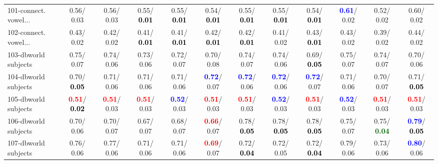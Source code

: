\begin{table}[h]
\begin{center}
{\begin{tabular}{lc|c|c|c|c|c|c|c|c|c|c}
101-connect. vowel... &   0.56/  0.03 &   0.56/  0.03 &   0.55/\textcolor{black}{\textbf{  0.01}} &   0.55/\textcolor{black}{\textbf{  0.01}} &   0.54/\textcolor{black}{\textbf{  0.01}} &   0.55/\textcolor{black}{\textbf{  0.01}} &   0.55/\textcolor{black}{\textbf{  0.01}} &   0.54/\textcolor{black}{\textbf{  0.01}} & \textcolor{blue}{\textbf{  0.61}}/  0.02 &   0.52/  0.02 &   0.60/  0.02 \\
102-connect. vowel... &   0.43/  0.02 &   0.42/  0.02 &   0.41/\textcolor{black}{\textbf{  0.01}} &   0.41/\textcolor{black}{\textbf{  0.01}} &   0.42/\textcolor{black}{\textbf{  0.01}} &   0.42/\textcolor{black}{\textbf{  0.01}} &   0.41/  0.02 &   0.43/\textcolor{black}{\textbf{  0.01}} &   0.43/  0.02 &   0.39/  0.02 &   0.44/  0.02 \\
103-dbworld subjects &   0.75/  0.07 &   0.74/  0.06 &   0.73/  0.06 &   0.72/  0.07 &   0.70/  0.08 &   0.74/  0.07 &   0.74/  0.06 &   0.69/\textcolor{black}{\textbf{  0.05}} &   0.75/  0.07 &   0.74/  0.07 &   0.70/  0.06 \\ \hline
104-dbworld subjects &   0.70/\textcolor{black}{\textbf{  0.05}} &   0.71/  0.06 &   0.71/  0.06 &   0.71/  0.06 & \textcolor{blue}{\textbf{  0.72}}/  0.07 & \textcolor{blue}{\textbf{  0.72}}/  0.06 & \textcolor{blue}{\textbf{  0.72}}/  0.06 & \textcolor{blue}{\textbf{  0.72}}/  0.07 &   0.71/  0.06 &   0.70/  0.07 &   0.71/\textcolor{black}{\textbf{  0.05}} \\
105-dbworld subjects & \textcolor{red}{\textbf{  0.51}}/\textcolor{black}{\textbf{  0.02}} & \textcolor{red}{\textbf{  0.51}}/  0.03 & \textcolor{red}{\textbf{  0.51}}/  0.03 & \textcolor{blue}{\textbf{  0.52}}/  0.03 & \textcolor{red}{\textbf{  0.51}}/  0.03 & \textcolor{red}{\textbf{  0.51}}/  0.03 & \textcolor{blue}{\textbf{  0.52}}/  0.03 & \textcolor{red}{\textbf{  0.51}}/  0.03 & \textcolor{blue}{\textbf{  0.52}}/  0.03 & \textcolor{red}{\textbf{  0.51}}/  0.03 & \textcolor{red}{\textbf{  0.51}}/  0.03 \\
106-dbworld subjects &   0.70/  0.06 &   0.70/  0.07 &   0.67/  0.07 &   0.68/  0.07 & \textcolor{red}{\textbf{  0.66}}/  0.07 &   0.78/\textcolor{black}{\textbf{  0.05}} &   0.78/\textcolor{black}{\textbf{  0.05}} &   0.78/\textcolor{black}{\textbf{  0.05}} &   0.75/  0.07 &   0.75/\textcolor{darkgreen}{\textbf{  0.04}} & \textcolor{blue}{\textbf{  0.79}}/\textcolor{black}{\textbf{  0.05}} \\
107-dbworld subjects &   0.76/  0.06 &   0.77/  0.06 &   0.71/  0.06 &   0.71/  0.06 & \textcolor{red}{\textbf{  0.69}}/  0.07 &   0.72/\textcolor{black}{\textbf{  0.04}} &   0.72/  0.05 &   0.72/\textcolor{black}{\textbf{  0.04}} &   0.79/  0.06 &   0.73/  0.06 & \textcolor{blue}{\textbf{  0.80}}/  0.06 \\

\end{tabular}}
\end{center}
\end{table}
